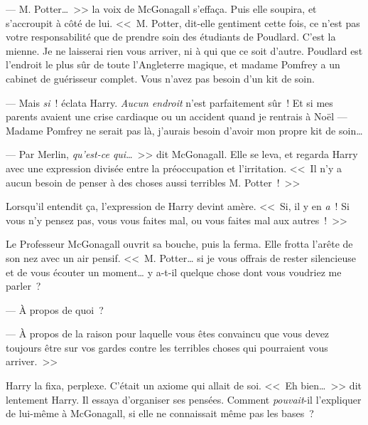 --- M. Potter…~>> la voix de McGonagall s'effaça. Puis elle soupira, et s'accroupit à côté de lui. <<~M. Potter, dit-elle gentiment cette fois, ce n'est pas votre responsabilité que de prendre soin des étudiants de Poudlard. C'est la mienne. Je ne laisserai rien vous arriver, ni à qui que ce soit d'autre. Poudlard est l'endroit le plus sûr de toute l'Angleterre magique, et madame Pomfrey a un cabinet de guérisseur complet. Vous n'avez pas besoin d'un kit de soin.

--- Mais \emph{si}~! éclata Harry. \emph{Aucun endroit} n'est parfaitement sûr~! Et si mes parents avaient une crise cardiaque ou un accident quand je rentrais à Noël — Madame Pomfrey ne serait pas là, j'aurais besoin d'avoir mon propre kit de soin…

--- Par Merlin, \emph{qu'est-ce qui}…~>> dit McGonagall. Elle se leva, et regarda Harry avec une expression divisée entre la préoccupation et l'irritation. <<~Il n'y a aucun besoin de penser à des choses aussi terribles M. Potter~!~>>

Lorsqu'il entendit ça, l'expression de Harry devint amère. <<~Si, il y en \emph{a}~! Si vous n'y pensez pas, vous vous faites mal, ou vous faites mal aux autres~!~>>

Le Professeur McGonagall ouvrit sa bouche, puis la ferma. Elle frotta l'arête de son nez avec un air pensif.
<<~M. Potter… si je vous offrais de rester silencieuse et de vous écouter un moment… y a-t-il quelque chose dont vous voudriez me parler~?

--- À propos de quoi~?

--- À propos de la raison pour laquelle vous êtes convaincu que vous devez toujours être sur vos gardes contre les terribles choses qui pourraient vous arriver.~>>

Harry la fixa, perplexe. C'était un axiome qui allait de soi. <<~Eh bien…~>> dit lentement Harry. Il essaya d'organiser ses pensées. Comment \emph{pouvait}-il l'expliquer de lui-même à McGonagall, si elle ne connaissait même pas les bases~?

